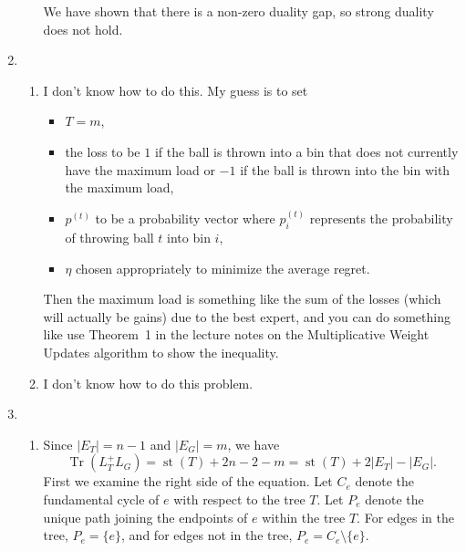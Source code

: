 \documentclass{article}
\newcommand{\0}{\mathbf{0}}
\DeclareMathOperator{\st}{st}
\DeclareMathOperator{\Tr}{Tr}
\begin{document}
\begin{enumerate}
\begin{enumerate}
    We have shown that there is a non-zero duality gap, so strong duality does not hold.
  \end{enumerate}
\item
  \begin{enumerate}
  \item
    I don't know how to do this.
    My guess is to set
    \begin{itemize}
      \item $T = m$,
      \item the loss to be $1$ if the ball is thrown into a bin that does not currently have the maximum load or $-1$ if the ball is thrown into the bin with the maximum load,
      \item $p^{(t)}$ to be a probability vector where $p^{(t)}_i$ represents the probability of throwing ball $t$ into bin $i$,
      \item $\eta$ chosen appropriately to minimize the average regret.
    \end{itemize}
    Then the maximum load is something like the sum of the losses (which will actually be gains) due to the best expert, and you can do something like use Theorem~1 in the lecture notes on the Multiplicative Weight Updates algorithm to show the inequality.
  \item I don't know how to do this problem.
  \end{enumerate}
\item
  \begin{enumerate}
  \item Since $|E_T| = n - 1$ and $|E_G| = m$, we have
    \begin{equation*}
      \Tr(L_T^+ L_G) = \st(T) + 2n - 2 - m = \st(T) + 2 |E_T| - |E_G|.
    \end{equation*}
    First we examine the right side of the equation.
    Let $C_e$ denote the fundamental cycle of $e$ with respect to the tree $T$.
    Let $P_e$ denote the unique path joining the endpoints of $e$ within the tree $T$.
    For edges in the tree, $P_e = \{e\}$, and for edges not in the tree, $P_e = C_e \setminus \{e\}$.

\end{enumerate}
\end{enumerate}
\end{document}
